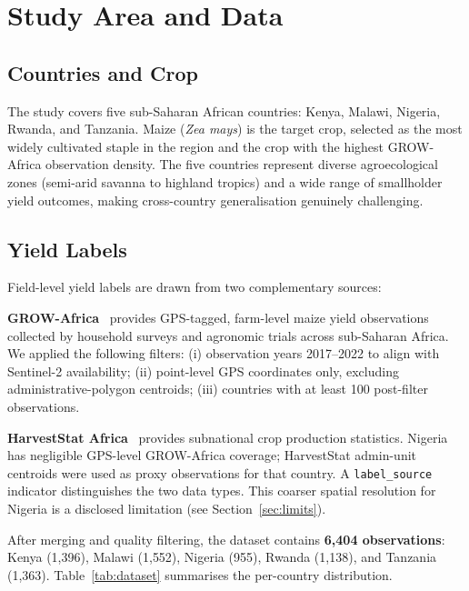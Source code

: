 \documentclass[journal]{IEEEtran}
\begin{document}
\section{Study Area and Data}
\label{sec:data}

\subsection{Countries and Crop}

The study covers five sub-Saharan African countries:
Kenya, Malawi, Nigeria, Rwanda, and Tanzania.
Maize (\textit{Zea mays}) is the target crop, selected as the most widely
cultivated staple in the region and the crop with the highest GROW-Africa
observation density.
The five countries represent diverse agroecological zones
(semi-arid savanna to highland tropics) and a wide range of smallholder
yield outcomes, making cross-country generalisation genuinely challenging.

\subsection{Yield Labels}

Field-level yield labels are drawn from two complementary sources:

\textbf{GROW-Africa}~\cite{grow_africa} provides GPS-tagged, farm-level maize
yield observations collected by household surveys and agronomic trials
across sub-Saharan Africa.
We applied the following filters: (i) observation years 2017--2022 to align
with Sentinel-2 availability; (ii) point-level GPS coordinates only, excluding
administrative-polygon centroids; (iii) countries with at least 100
post-filter observations.

\textbf{HarvestStat Africa}~\cite{lee2025harveststat} provides subnational
crop production statistics.
Nigeria has negligible GPS-level GROW-Africa coverage; HarvestStat admin-unit
centroids were used as proxy observations for that country.
A \texttt{label\_source} indicator distinguishes the two data types.
This coarser spatial resolution for Nigeria is a disclosed limitation
(see Section~\ref{sec:limits}).

After merging and quality filtering, the dataset contains
\textbf{6{,}404 observations}:
Kenya (1{,}396), Malawi (1{,}552), Nigeria (955),
Rwanda (1{,}138), and Tanzania (1{,}363).
Table~\ref{tab:dataset} summarises the per-country distribution.
\end{document}
